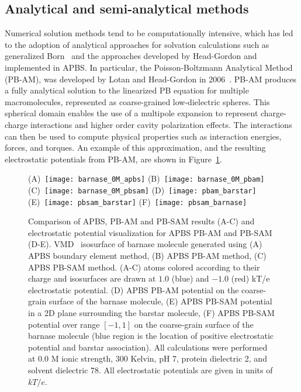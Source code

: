 \documentclass[12pt,titlepage]{article}
\newcommand{\revision}[1]{#1}
\begin{document}
\subsection{Analytical and semi-analytical methods} \label{sec:pbam}
Numerical solution methods tend to be computationally intensive, which has led to the adoption \revision{of} analytical approaches for solvation calculations such as generalized Born~\cite{Bashford2000} and the approaches developed by Head-Gordon and implemented in APBS.
In particular, the Poisson-Boltzmann Analytical Method (PB-AM), was developed by Lotan and Head-Gordon in 2006~\cite{Lotan2006}.
PB-AM produces a fully analytical solution to the linearized PB equation for multiple macromolecules, represented as coarse-grained low-dielectric spheres.
This spherical domain enables the use of a multipole expansion to represent charge-charge interactions and higher order cavity polarization effects.
The interactions can then be used to compute physical properties such as interaction energies, forces, and torques.
An example of this approximation, and the resulting electrostatic potentials from PB-AM, are shown in Figure~\ref{fig:pbsam-results}.
\begin{figure}
	\centering
	(A)~\texttt{[image: barnase\_0M\_apbs]} 
	(B)~\texttt{[image: barnase\_0M\_pbam]} 
	(C)~\texttt{[image: barnase\_0M\_pbsam]}
	(D)~\texttt{[image: pbam\_barstar]} 
	(E)~\texttt{[image: pbsam\_barstar]} 
	(F)~\texttt{[image: pbsam\_barnase]}
	\caption{\revision{Comparison of APBS, PB-AM and PB-SAM results (A-C) and electrostatic potential visualization for APBS PB-AM and PB-SAM (D-E).
			VMD~\cite{Humphrey1996} isosurface of barnase molecule generated using
		(A) APBS boundary element method,
		(B) APBS PB-AM method, 
		(C) APBS PB-SAM method. (A-C) atoms colored according to their charge and isosurfaces are drawn at $1.0$ (blue) and $-1.0$ (red) kT/e electrostatic potential.
		(D) APBS PB-AM potential on the coarse-grain surface of the barnase molecule, 
		(E) APBS PB-SAM potential in a 2D plane surrounding the barstar molecule,
		(F) APBS PB-SAM potential over range $[-1, 1]$ on the coarse-grain surface of the barnase molecule (blue region is the location of positive electrostatic potential and barstar association).
		All calculations were performed at 0.0 M ionic strength, 300 Kelvin, pH 7, protein dielectric 2, and solvent dielectric 78.
		All electrostatic potentials are given in units of $kT/e$.}
	}
	\label{fig:pbsam-results}
\end{figure}
\end{document}
